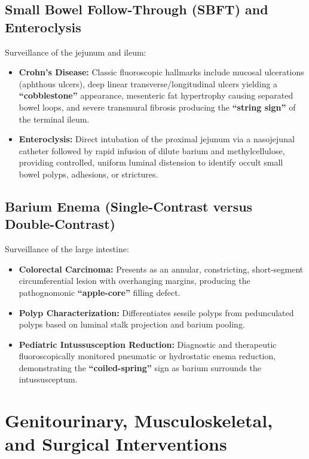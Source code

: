 \documentclass[11pt,a4paper]{article}
\begin{document}
\subsection{Small Bowel Follow-Through (SBFT) and Enteroclysis}

Surveillance of the jejunum and ileum:
\begin{itemize}[leftmargin=*]
    \item \textbf{Crohn's Disease:} Classic fluoroscopic hallmarks include mucosal ulcerations (aphthous ulcers), deep linear transverse/longitudinal ulcers yielding a \textbf{``cobblestone''} appearance, mesenteric fat hypertrophy causing separated bowel loops, and severe transmural fibrosis producing the \textbf{``string sign''} of the terminal ileum.
    \item \textbf{Enteroclysis:} Direct intubation of the proximal jejunum via a nasojejunal catheter followed by rapid infusion of dilute barium and methylcellulose, providing controlled, uniform luminal distension to identify occult small bowel polyps, adhesions, or strictures.
\end{itemize}

\subsection{Barium Enema (Single-Contrast versus Double-Contrast)}

Surveillance of the large intestine:
\begin{itemize}[leftmargin=*]
    \item \textbf{Colorectal Carcinoma:} Presents as an annular, constricting, short-segment circumferential lesion with overhanging margins, producing the pathognomonic \textbf{``apple-core''} filling defect.
    \item \textbf{Polyp Characterization:} Differentiates sessile polyps from pedunculated polyps based on luminal stalk projection and barium pooling.
    \item \textbf{Pediatric Intussusception Reduction:} Diagnostic and therapeutic fluoroscopically monitored pneumatic or hydrostatic enema reduction, demonstrating the \textbf{``coiled-spring''} sign as barium surrounds the intussusceptum.
\end{itemize}

\section{Genitourinary, Musculoskeletal, and Surgical Interventions}
\end{document}
